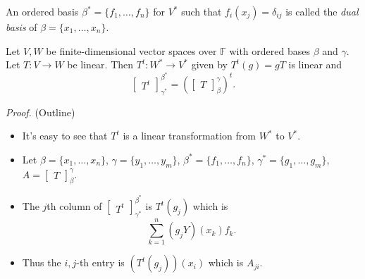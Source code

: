 \documentclass[12pt]{article}
\newenvironment{theorem}[2][Theorem]{\begin{trivlist}
\item[\hskip \labelsep {\bfseries #1}\hskip \labelsep {\bfseries #2.}]}{\end{trivlist}}
\newenvironment{definition}[2][Definition]{\begin{trivlist}
\item[\hskip \labelsep {\bfseries #1}\hskip \labelsep {\bfseries #2}]}{\end{trivlist}}
\begin{document}
\begin{definition}{10}
An ordered basis $\beta^* = \{f_1, \dots, f_n\}$ for $V^*$ such that $f_i(x_j) = \delta_{ij}$ is called the \textit{dual basis} of $\beta = \{x_1, \dots, x_n\}$.
\end{definition}

\begin{theorem}{2.25}
Let $V, W$ be finite-dimensional vector spaces over $\mathbb{F}$ with ordered bases $\beta$ and $\gamma$. Let $T : V \to W$ be linear. Then $T^t : W^* \to V^*$ given by $T^t(g) = gT$ is linear and $$\begin{bmatrix} T^t \end{bmatrix}_{\gamma^*}^{\beta^*} = (\begin{bmatrix} T \end{bmatrix}_\beta^\gamma)^t.$$
\end{theorem}

\textit{Proof.} (Outline)
\begin{itemize}
    \item It's easy to see that $T^t$ is a linear transformation from $W^*$ to $V^*$.
    
    \item Let $\beta = \{x_1, \dots, x_n\}$, $\gamma = \{y_1, \dots, y_m\}$, $\beta^* = \{f_1, \dots, f_n\}$, $\gamma^* = \{g_1, \dots, g_m\}$, $A = \begin{bmatrix} T \end{bmatrix}_\beta^\gamma$.
    
    \item The $j$th column of $\begin{bmatrix} T^t \end{bmatrix}_{\gamma^*}^{\beta^*}$ is $T^t(g_j)$ which is $$\sum_{k = 1}^n (g_jY)(x_k)f_k.$$
    
    \item Thus the $i, j$-th entry is $(T^t(g_j))(x_i)$ which is $A_{ji}$.
\end{itemize}
\end{document}
